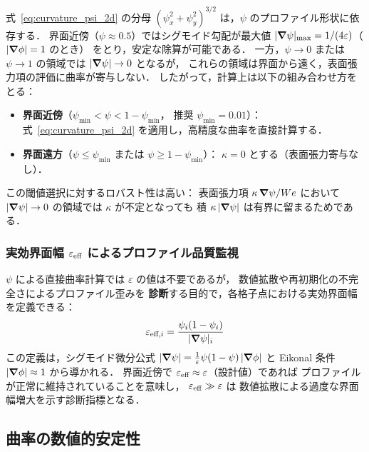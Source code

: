 式~\eqref{eq:curvature_psi_2d} の分母
$(\psi_x^2+\psi_y^2)^{3/2}$ は，$\psi$ のプロファイル形状に依存する．
界面近傍（$\psi \approx 0.5$）ではシグモイド勾配が最大値
$|\bm{\nabla}\psi|_{\max} = 1/(4\varepsilon)$（$|\bm{\nabla}\phi|=1$ のとき）
をとり，安定な除算が可能である．
一方，$\psi \to 0$ または $\psi \to 1$ の領域では
$|\bm{\nabla}\psi| \to 0$ となるが，
これらの領域は界面から遠く，表面張力項の評価に曲率が寄与しない．
したがって，計算上は以下の組み合わせ方をとる：
\begin{itemize}
  \item \textbf{界面近傍}（$\psi_{\min} < \psi < 1-\psi_{\min}$，
        推奨 $\psi_{\min}=0.01$）：
        式~\eqref{eq:curvature_psi_2d} を適用し，高精度な曲率を直接計算する．
  \item \textbf{界面遠方}（$\psi \le \psi_{\min}$ または
        $\psi \ge 1-\psi_{\min}$）：
        $\kappa = 0$ とする（表面張力寄与なし）．
\end{itemize}
この閾値選択に対するロバスト性は高い：
表面張力項 $\kappa\,\bm{\nabla}\psi/We$ において
$|\bm{\nabla}\psi| \to 0$ の領域では $\kappa$ が不定となっても
積 $\kappa\,|\bm{\nabla}\psi|$ は有界に留まるためである．

\subsubsection{実効界面幅 \texorpdfstring{$\varepsilon_{\textup{eff}}$}{ε\_eff} によるプロファイル品質監視}

$\psi$ による直接曲率計算では $\varepsilon$ の値は不要であるが，
数値拡散や再初期化の不完全さによるプロファイル歪みを
\textbf{診断}する目的で，各格子点における実効界面幅を定義できる：
\begin{equation}
  \varepsilon_{\textup{eff},i}
  = \frac{\psi_i(1-\psi_i)}{|\bm{\nabla}\psi|_i}
\end{equation}
この定義は，シグモイド微分公式
$|\bm{\nabla}\psi| = \frac{1}{\varepsilon}\psi(1-\psi)\,|\bm{\nabla}\phi|$
と Eikonal 条件 $|\bm{\nabla}\phi| \approx 1$ から導かれる．
界面近傍で $\varepsilon_{\textup{eff}} \approx \varepsilon$（設計値）であれば
プロファイルが正常に維持されていることを意味し，
$\varepsilon_{\textup{eff}} \gg \varepsilon$ は
数値拡散による過度な界面幅増大を示す診断指標となる．

\subsection{曲率の数値的安定性}
\label{sec:curvature_stab}

